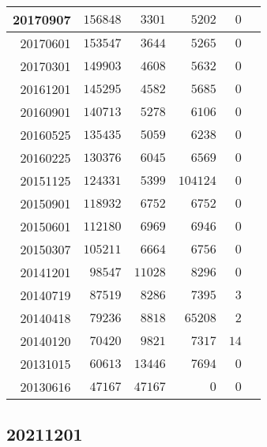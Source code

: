 \documentclass[hidelinks,a4paper,12pt]{article}
\begin{document}
\begin{center}
\begin{tabular}{|r|r|r|r|r|r|}
20170907         & $156848$         & $3301$         & $5202$           & $0$              \\ \hline
20170601         & $153547$         & $3644$         & $5265$           & $0$              \\ \hline
20170301         & $149903$         & $4608$         & $5632$           & $0$              \\ \hline
20161201         & $145295$         & $4582$         & $5685$           & $0$              \\ \hline
20160901         & $140713$         & $5278$         & $6106$           & $0$              \\ \hline
20160525         & $135435$         & $5059$         & $6238$           & $0$              \\ \hline
20160225         & $130376$         & $6045$         & $6569$           & $0$              \\ \hline
20151125         & $124331$         & $5399$         & $104124$         & $0$              \\ \hline
20150901         & $118932$         & $6752$         & $6752$           & $0$              \\ \hline
20150601         & $112180$         & $6969$         & $6946$           & $0$              \\ \hline
20150307         & $105211$         & $6664$         & $6756$           & $0$              \\ \hline
20141201         & $98547$          & $11028$        & $8296$           & $0$              \\ \hline
20140719         & $87519$          & $8286$         & $7395$           & $3$              \\ \hline
20140418         & $79236$          & $8818$         & $65208$          & $2$              \\ \hline
20140120         & $70420$          & $9821$         & $7317$           & $14$             \\ \hline
20131015         & $60613$          & $13446$        & $7694$           & $0$              \\ \hline
20130616         & $47167$          & $47167$        & $0$              & $0$              \\ \hline
\end{tabular}
\end{center}

\subsection{20211201}  \label{sec:changelog_20211201}
\end{document}
